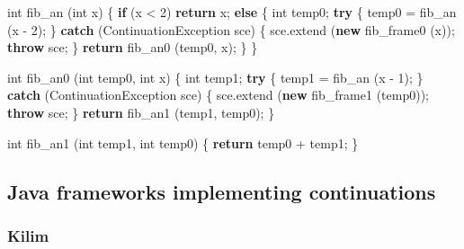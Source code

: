 \documentclass[12pt,a4paper,oneside,openright]{book}
\newenvironment{Shaded}{\begin{snugshade}}{\end{snugshade}}
\newcommand{\KeywordTok}[1]{\textcolor[rgb]{0.13,0.29,0.53}{\textbf{{#1}}}}
\newcommand{\DataTypeTok}[1]{\textcolor[rgb]{0.13,0.29,0.53}{{#1}}}
\newcommand{\DecValTok}[1]{\textcolor[rgb]{0.00,0.00,0.81}{{#1}}}
\newcommand{\FunctionTok}[1]{\textcolor[rgb]{0.00,0.00,0.00}{{#1}}}
\newcommand{\NormalTok}[1]{{#1}}
\begin{document}
\begin{Shaded}
\begin{Highlighting}[]
    \DataTypeTok{int} \FunctionTok{fib_an} \NormalTok{(}\DataTypeTok{int} \NormalTok{x) \{}
        \KeywordTok{if} \NormalTok{(x < }\DecValTok{2}\NormalTok{)}
            \KeywordTok{return} \NormalTok{x;}
        \KeywordTok{else} \NormalTok{\{}
            \DataTypeTok{int} \NormalTok{temp0;}
            \KeywordTok{try} \NormalTok{\{}
                \NormalTok{temp0 = }\FunctionTok{fib_an} \NormalTok{(x - }\DecValTok{2}\NormalTok{);}
            \NormalTok{\} }\KeywordTok{catch} \NormalTok{(ContinuationException sce) \{}
                \NormalTok{sce.}\FunctionTok{extend} \NormalTok{(}\KeywordTok{new} \FunctionTok{fib_frame0} \NormalTok{(x));}
                \KeywordTok{throw} \NormalTok{sce;}
            \NormalTok{\}}
            \KeywordTok{return} \FunctionTok{fib_an0} \NormalTok{(temp0, x);}
        \NormalTok{\}}
    \NormalTok{\}}

    \DataTypeTok{int} \FunctionTok{fib_an0} \NormalTok{(}\DataTypeTok{int} \NormalTok{temp0, }\DataTypeTok{int} \NormalTok{x) \{}
        \DataTypeTok{int} \NormalTok{temp1;}
        \KeywordTok{try} \NormalTok{\{}
            \NormalTok{temp1 = }\FunctionTok{fib_an} \NormalTok{(x - }\DecValTok{1}\NormalTok{);}
        \NormalTok{\} }\KeywordTok{catch} \NormalTok{(ContinuationException sce) \{}
            \NormalTok{sce.}\FunctionTok{extend} \NormalTok{(}\KeywordTok{new} \FunctionTok{fib_frame1} \NormalTok{(temp0));}
            \KeywordTok{throw} \NormalTok{sce;}
        \NormalTok{\}}
        \KeywordTok{return} \FunctionTok{fib_an1} \NormalTok{(temp1, temp0);}
    \NormalTok{\}}

    \DataTypeTok{int} \FunctionTok{fib_an1} \NormalTok{(}\DataTypeTok{int} \NormalTok{temp1, }\DataTypeTok{int} \NormalTok{temp0) \{}
        \KeywordTok{return} \NormalTok{temp0 + temp1;}
    \NormalTok{\}}
\end{Highlighting}
\end{Shaded}

\subsection{Java frameworks implementing
continuations}\label{java-frameworks-implementing-continuations}

\subsubsection{Kilim}\label{kilim}
\end{document}
